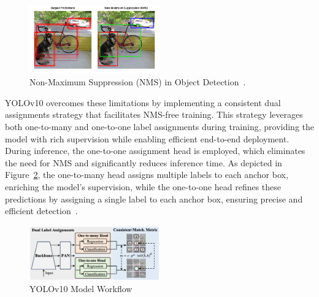 \documentclass[12pt,oneside]{book} %
\begin{document}
\begin{figure}[H]
    \centering
    \includegraphics[width=0.5\textwidth]{figures/NMS.png}
    \caption{Non-Maximum Suppression (NMS) in Object Detection~\cite{LearnOpenCVYOLOv10}.}\label{fig:nms}
\end{figure}

YOLOv10 overcomes these limitations by implementing a consistent dual
assignments strategy that facilitates NMS-free training. This strategy
leverages both one-to-many and one-to-one label assignments during training,
providing the model with rich supervision while enabling efficient end-to-end
deployment. During inference, the one-to-one assignment head is employed, which
eliminates the need for NMS and significantly reduces inference time. As
depicted in Figure~\ref{fig:yolov10}, the one-to-many head assigns multiple
labels to each anchor box, enriching the model’s supervision, while the
one-to-one head refines these predictions by assigning a single label to each
anchor box, ensuring precise and efficient detection~\cite{wang2024yolov10}.

\begin{figure}[H]
    \centering
    \includegraphics[width=0.5\textwidth]{figures/YOLOV10.png}
    \caption{YOLOv10 Model Workflow~\cite{wang2024yolov10}}\label{fig:yolov10}
\end{figure}
\end{document}

